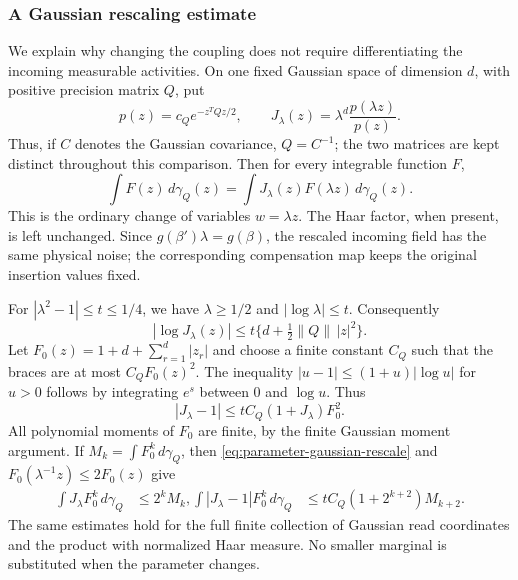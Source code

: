 \subsubsection{A Gaussian rescaling estimate}
We explain why changing the coupling does not require differentiating
the incoming measurable activities. On one fixed Gaussian space of
dimension $d$, with positive precision matrix $Q$, put
\[
 p(z)=c_Q e^{-z^TQz/2},\qquad
 J_\lambda(z)=\lambda^d\frac{p(\lambda z)}{p(z)}.
\]
Thus, if $C$ denotes the Gaussian covariance, $Q=C^{-1}$; the two
matrices are kept distinct throughout this comparison.
Then for every integrable function $F$,
\begin{equation}\label{eq:parameter-gaussian-rescale}
       \int F(z)\,d\gamma_Q(z)
       =\int J_\lambda(z)F(\lambda z)\,d\gamma_Q(z).
\end{equation}
This is the ordinary change of variables $w=\lambda z$. The Haar
factor, when present, is left unchanged. Since
$g(\beta')\lambda=g(\beta)$, the rescaled incoming field has the
same physical noise; the corresponding compensation map keeps the
original insertion values fixed.

For $|\lambda^2-1|\le t\le1/4$, we have $\lambda\ge1/2$ and
$|\log\lambda|\le t$. Consequently
\[
 |\log J_\lambda(z)|\le
                      t\{d+\tfrac12\|Q\|\,|z|^2\}.
\]
Let $F_0(z)=1+d+\sum_{r=1}^d|z_r|$ and choose a finite constant
$C_Q$ such that the braces are at most $C_QF_0(z)^2$.
The inequality $|u-1|\le(1+u)|\log u|$ for $u>0$ follows by
integrating $e^s$ between $0$ and $\log u$. Thus
\[
 |J_\lambda-1|\le t C_Q(1+J_\lambda)F_0^2.
\]
All polynomial moments of $F_0$ are finite, by the finite Gaussian
moment argument. If $M_k=\int F_0^k\,d\gamma_Q$, then
\eqref{eq:parameter-gaussian-rescale} and
$F_0(\lambda^{-1}z)\le2F_0(z)$ give
\begin{align}
 \int J_\lambda F_0^k\,d\gamma_Q&\le2^kM_k,
 \int |J_\lambda-1|F_0^k\,d\gamma_Q
                   &\le t C_Q(1+2^{k+2})M_{k+2}.
 \label{eq:parameter-gaussian-moment-difference}
\end{align}
The same estimates hold for the full finite collection of Gaussian
read coordinates and the product with normalized Haar measure.
No smaller marginal is substituted when the parameter changes.

